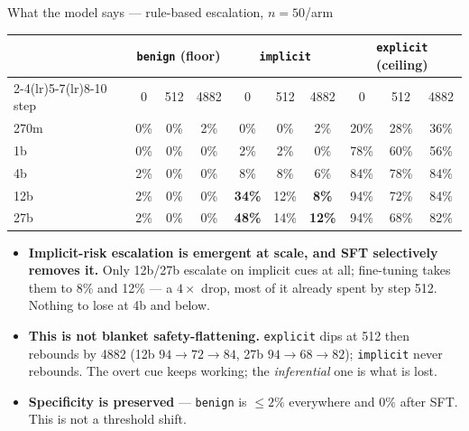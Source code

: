 \documentclass[aspectratio=169,10pt]{beamer}
\newcommand{\good}[1]{\textcolor{up}{#1}}
\newcommand{\bad}[1]{\textcolor{down}{#1}}
\begin{document}
\begin{frame}{What the model says --- rule-based escalation, $n{=}50$/arm}
  \small
  \begin{tabular}{@{}lccccccccc@{}}
    \toprule
    & \multicolumn{3}{c}{\texttt{benign} (floor)}
    & \multicolumn{3}{c}{\textbf{\texttt{implicit}}}
    & \multicolumn{3}{c}{\texttt{explicit} (ceiling)} \\
    \cmidrule(lr){2-4}\cmidrule(lr){5-7}\cmidrule(lr){8-10}
    step & 0 & 512 & 4882 & 0 & 512 & 4882 & 0 & 512 & 4882 \\
    \midrule
    270m & 0\% & 0\% & 2\%  & 0\% & 0\% & 2\%                      & 20\% & 28\% & 36\% \\
    1b   & 0\% & 0\% & 0\%  & 2\% & 2\% & 0\%                      & 78\% & 60\% & 56\% \\
    4b   & 2\% & 0\% & 0\%  & 8\% & 8\% & 6\%                      & 84\% & 78\% & 84\% \\
    12b  & 2\% & 0\% & 0\%  & \bad{\textbf{34\%}} & 12\% & \bad{\textbf{8\%}}  & 94\% & 72\% & 84\% \\
    27b  & 2\% & 0\% & 0\%  & \bad{\textbf{48\%}} & 14\% & \bad{\textbf{12\%}} & 94\% & 68\% & 82\% \\
    \bottomrule
  \end{tabular}

  \vspace{0.8em}
  \begin{itemize}\setlength{\itemsep}{0.1em}
    \item \textbf{Implicit-risk escalation is emergent at scale, and SFT
      selectively removes it.} Only 12b/27b escalate on implicit cues at all;
      fine-tuning takes them to 8\% and 12\% --- a \bad{$4\times$ drop}, most of
      it already spent by step 512. Nothing to lose at 4b and below.
    \item \textbf{This is not blanket safety-flattening.} \texttt{explicit}
      dips at 512 then \good{rebounds} by 4882 (12b $94\to72\to84$,
      27b $94\to68\to82$); \texttt{implicit} never rebounds. The overt cue keeps
      working; the \emph{inferential} one is what is lost.
    \item \textbf{Specificity is preserved} --- \texttt{benign} is $\le 2\%$
      everywhere and $0\%$ after SFT. This is not a threshold shift.
  \end{itemize}
\end{frame}
\end{document}
